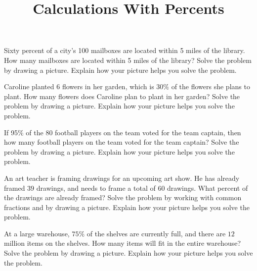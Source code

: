 \documentclass[nooutcomes,noauthor,handout]{ximera}
\title{Calculations With Percents}
\begin{document}
\begin{abstract}\end{abstract}
\maketitle




\begin{problem}
 Sixty percent of a city's 100 mailboxes are located within 5 miles of the library.  How many mailboxes are located within 5 miles of the library?  Solve the problem by drawing a picture.  Explain how your picture helps you solve the problem. 
 
 

\vfill
\end{problem}
\begin{problem}

Caroline planted $6$ flowers in her garden, which is $30\%$ of the flowers she plans to plant. How many flowers does Caroline plan to plant in her garden? Solve the problem by drawing a picture.  Explain how your picture helps you solve the problem.  

\vfill
\end{problem}
\newpage





\begin{problem}
 If 95$\%$ of the 80 football players on the team voted for the team captain, then how many football players on the team voted for the team captain?  Solve the problem by drawing a picture.  Explain how your picture helps you solve the problem.  
 
 
 
 
 \vfill
\end{problem}




\begin{problem}
An art teacher is framing drawings for an upcoming art show. He has already framed $39$ drawings, and needs to frame a total of $60$ drawings. What percent of the drawings are already framed? Solve the problem by working with common fractions and by drawing a picture.  Explain how your picture helps you solve the problem.  

 
\vfill
\end{problem}





\begin{problem}

At a large warehouse, $75\%$ of the shelves are currently full, and there are $12$ million items on the shelves. How many items will fit in the entire warehouse? Solve the problem by drawing a picture.  Explain how your picture helps you solve the problem.  


\vfill
\end{problem}
\end{document}
